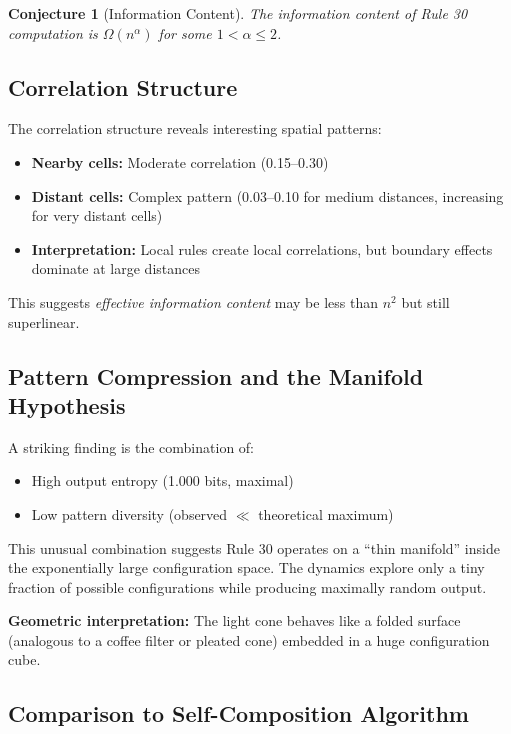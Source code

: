 \documentclass[11pt]{article}
\newtheorem{conjecture}[theorem]{Conjecture}
\begin{document}
\begin{conjecture}[Information Content]
The information content of Rule 30 computation is $\Omega(n^\alpha)$ for some $1 < \alpha \leq 2$.
\end{conjecture}

\subsection{Correlation Structure}

The correlation structure reveals interesting spatial patterns:
\begin{itemize}
    \item \textbf{Nearby cells:} Moderate correlation (0.15--0.30)
    \item \textbf{Distant cells:} Complex pattern (0.03--0.10 for medium distances, increasing for very distant cells)
    \item \textbf{Interpretation:} Local rules create local correlations, but boundary effects dominate at large distances
\end{itemize}

This suggests \emph{effective information content} may be less than $n^2$ but still superlinear.

\subsection{Pattern Compression and the Manifold Hypothesis}

A striking finding is the combination of:
\begin{itemize}
    \item High output entropy (1.000 bits, maximal)
    \item Low pattern diversity (observed $\ll$ theoretical maximum)
\end{itemize}

This unusual combination suggests Rule 30 operates on a ``thin manifold'' inside the exponentially large configuration space. The dynamics explore only a tiny fraction of possible configurations while producing maximally random output.

\textbf{Geometric interpretation:} The light cone behaves like a folded surface (analogous to a coffee filter or pleated cone) embedded in a huge configuration cube.

\subsection{Comparison to Self-Composition Algorithm}
\end{document}
